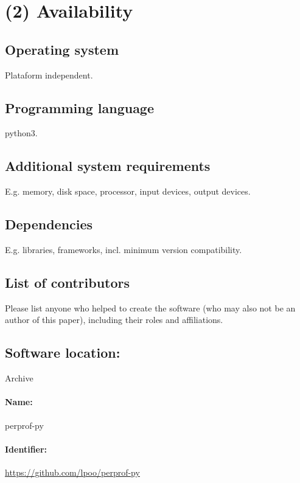 \documentclass[10pt,a4paper]{article}
\begin{document}
\section*{(2) Availability}

\subsection*{Operating system}

    Plataform independent.

\subsection*{Programming language}

    python3.

\subsection*{Additional system requirements}

    E.g. memory, disk space, processor, input devices, output devices.

\subsection*{Dependencies}

    E.g. libraries, frameworks, incl. minimum version compatibility.

\subsection*{List of contributors}

    Please list anyone who helped to create the software (who may also not be an
    author of this paper), including their roles and affiliations.

\subsection*{Software location:}

    Archive

    \paragraph{Name:} perprof-py

    \paragraph{Identifier:} \url{https://github.com/lpoo/perprof-py}
\end{document}
